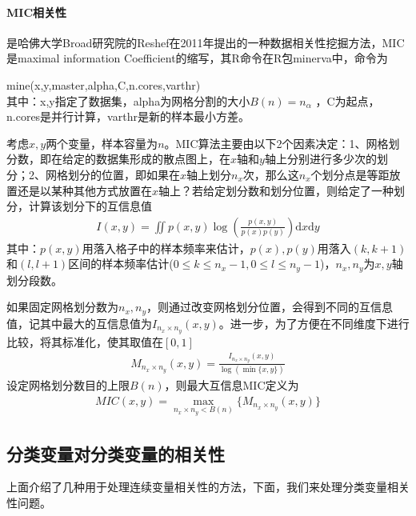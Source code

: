         \paragraph{MIC相关性}是哈佛大学Broad研究院的Reshef在2011年提出的一种数据相关性挖掘方法，MIC是maximal information Coefficient的缩写，其R命令在R包minerva中，命令为
        \par
        mine(x,y,master,alpha,C,n.cores,varthr)\\
        其中：x,y指定了数据集，alpha为网格分割的大小$B(n) = n_\alpha$ ，C为起点，n.cores是并行计算，varthr是新的样本最小方差。
        \par
        考虑$x,y$两个变量，样本容量为$n$。MIC算法主要由以下2个因素决定：1、网格划分数，即在给定的数据集形成的散点图上，在$x$轴和$y$轴上分别进行多少次的划分；2、网格划分的位置，即如果在$x$轴上划分$n_x$次，那么这$n_x$个划分点是等距放置还是以某种其他方式放置在$x$轴上？若给定划分数和划分位置，则给定了一种划分，计算该划分下的互信息值
        \begin{align*}
        I(x,y) = \iint p(x,y) \log \left( \frac{p(x,y)}{p(x)p(y)} \right) \mathrm{d}x\mathrm{d}y
        \end{align*}
        其中：$p(x,y)$用落入格子中的样本频率来估计，$p(x),p(y)$用落入$(k,k+1)$和$(l,l+1)$区间的样本频率估计($0 \leqslant k \leqslant n_x-1, 0 \leqslant l \leqslant n_y-1$)，$n_x,n_y$为$x,y$轴划分段数。
        \par
        如果固定网格划分数为$n_x,n_y$，则通过改变网格划分位置，会得到不同的互信息值，记其中最大的互信息值为$I_{n_x\times n_y}(x,y)$。进一步，为了方便在不同维度下进行比较，将其标准化，使其取值在$[0,1]$
        \begin{align*}
        M_{n_x\times n_y}(x,y) = \frac{I_{n_x\times n_y}(x,y)}{\log (\min\{x,y\})}
        \end{align*}
        设定网格划分数目的上限$B(n)$，则最大互信息MIC定义为
        \begin{align*}
        MIC(x,y) = \max_{n_x \times  n_y <B(n)} \{M_{n_x\times n_y}(x,y)\}
        \end{align*}

    \subsection{分类变量对分类变量的相关性}
        \par
        上面介绍了几种用于处理连续变量相关性的方法，下面，我们来处理分类变量相关性问题。
